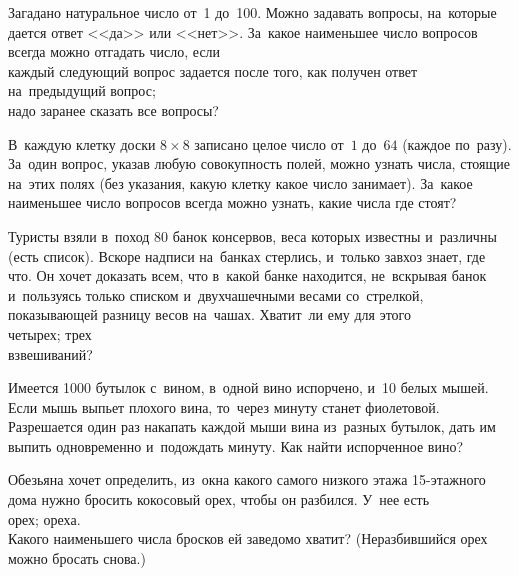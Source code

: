 


\begin{problems}

\item
Загадано натуральное число от~1 до~100.
Можно задавать вопросы, на~которые дается ответ <<да>> или <<нет>>.
За~какое наименьшее число вопросов всегда можно отгадать число, если
\\
\subproblem
каждый следующий вопрос задается после того, как получен ответ на~предыдущий
вопрос;
\\
\subproblem
надо заранее сказать все вопросы?

\item
В~каждую клетку доски $8 \times 8$ записано целое число от~$1$ до~$64$
(каждое по~разу).
За~один вопрос, указав любую совокупность полей, можно узнать числа, стоящие
на~этих полях
(без указания, какую клетку какое число занимает).
За~какое наименьшее число вопросов всегда можно узнать, какие числа где стоят?

\item
Туристы взяли в~поход $80$ банок консервов, веса которых известны и~различны
(есть список).
Вскоре надписи на~банках стерлись, и~только завхоз знает, где что.
Он хочет доказать всем, что в~какой банке находится, не~вскрывая банок
и~пользуясь только списком и~двухчашечными весами со~стрелкой, показывающей
разницу весов на~чашах.
Хватит~ли ему для этого
\\
\subproblem четырех;
\quad
\subproblem трех
\\
взвешиваний?

\item
Имеется 1000 бутылок с~вином, в~одной вино испорчено, и~10 белых мышей.
Если мышь выпьет плохого вина, то~через минуту станет фиолетовой.
Разрешается один раз накапать каждой мыши вина из~разных бутылок, дать им
выпить одновременно и~подождать минуту.
Как найти испорченное вино?

\item
Обезьяна хочет определить, из~окна какого самого низкого этажа 15-этажного дома
нужно бросить кокосовый орех, чтобы он разбился.
У~нее есть
\\
 орех;
\qquad
{} ореха.
\\
Какого наименьшего числа бросков ей заведомо хватит?
(Неразбившийся орех можно бросать снова.)


\end{problems}
